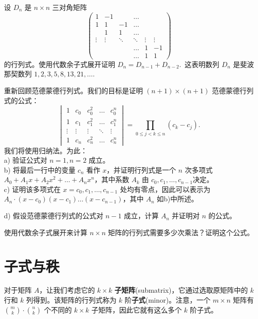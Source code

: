 \begin{problemset}
\item \label{ex:03-05-05} 设 $D_n$ 是 $n \times n$ 三对角矩阵
$$
\begin{pmatrix}
1 & -1 &  & \dots &  &  \\
1 & 1 & -1 & \dots &  &  \\
 & 1 & 1 & \dots &  &  \\
\vdots & \vdots & \ddots & \ddots & \vdots & \vdots \\
 &  &  & \dots & 1 & -1 \\
 &  &  & \dots & 1 & 1
\end{pmatrix}
$$
的行列式。使用代数余子式展开证明 $D_n = D_{n-1} + D_{n-2}$.~这表明数列 $D_n$ 是斐波那契数列 $1, 2, 3, 5, 8, 13, 21, \dots$.~
\item \label{ex:03-05-06} 重新回顾范德蒙德行列式。我们的目标是证明 $(n+1) \times (n+1)$ 范德蒙德行列式的公式：
$$
\begin{vmatrix}
1 & c_0 & c_0^2 & \dots & c_0^n \\
1 & c_1 & c_1^2 & \dots & c_1^n \\
\vdots & \vdots & \vdots & \ddots & \vdots \\
1 & c_n & c_n^2 & \dots & c_n^n
\end{vmatrix} = \prod_{0 \le j < k \le n} (c_k - c_j).
$$
我们将使用归纳法。为此：
\\
a) 验证公式对 $n=1, n=2$ 成立。
\\
b) 将最后一行中的变量 $c_n$ 看作 $x$，并证明行列式是一个 $n$ 次多项式 $A_0 + A_1 x + A_2 x^2 + \dots + A_n x^n$，其中系数 $A_k$ 由 $c_0, c_1, \dots, c_{n-1}$决定。
\\
c) 证明该多项式在 $x = c_0, c_1, \dots, c_{n-1}$ 处均有零点，因此可以表示为 $A_n \cdot (x - c_0)(x - c_1) \dots (x - c_{n-1})$，其中 $A_n$ 如b)中所述。

d) 假设范德蒙德行列式的公式对 $n-1$ 成立，计算 $A_n$ 并证明对 $n$ 的公式。
\item \label{ex:03-05-07} 使用代数余子式展开来计算 $n \times n$ 矩阵的行列式需要多少次乘法？证明这个公式。
\end{problemset}


\section{子式与秩}\label{sec:03-06}

对于矩阵 $A$，让我们考虑它的 $k \times k$ \textbf{子矩阵}(submatrix)，它通过选取原矩阵中的 $k$ 行和 $k$ 列得到。该矩阵的行列式称为 $k$ 阶\textbf{子式}(minor)。注意，一个 $m \times n$ 矩阵有 $\binom{m}{k} \cdot \binom{n}{k}$ 个不同的 $k \times k$ 子矩阵，因此它就有这么多个 $k$ 阶子式。

